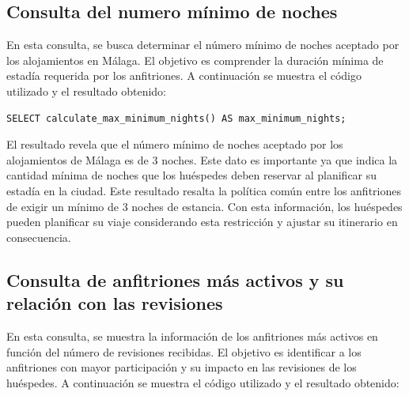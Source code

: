 \subsection{Consulta del numero mínimo de noches}
En esta consulta, se busca determinar el número mínimo de noches aceptado por los alojamientos en Málaga. El objetivo es comprender la duración mínima de estadía requerida por los anfitriones. A continuación se muestra el código utilizado y el resultado obtenido:
\begin{verbatim}
SELECT calculate_max_minimum_nights() AS max_minimum_nights;
\end{verbatim}

El resultado revela que el número mínimo de noches aceptado por los alojamientos de Málaga es de 3 noches. Este dato es importante ya que indica la cantidad mínima de noches que los huéspedes deben reservar al planificar su estadía en la ciudad. Este resultado resalta la política común entre los anfitriones de exigir un mínimo de 3 noches de estancia. Con esta información, los huéspedes pueden planificar su viaje considerando esta restricción y ajustar su itinerario en consecuencia.
\newpage
\subsection{Consulta de anfitriones más activos y su relación con las revisiones}

En esta consulta, se muestra la información de los anfitriones más activos en función del número de revisiones recibidas. El objetivo es identificar a los anfitriones con mayor participación y su impacto en las revisiones de los huéspedes. A continuación se muestra el código utilizado y el resultado obtenido:

